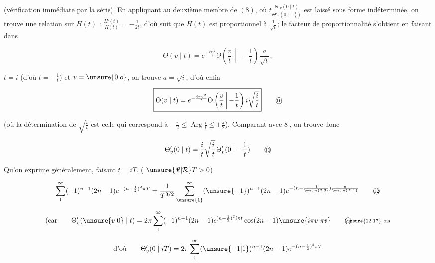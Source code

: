 (vérification immédiate par la série). En appliquant au deuxième membre de $(8)$, où $t\frac{{\Theta}'_v(0\mid t)}{\Theta'_v(0\mid-\frac1t)}$ est laissé sous forme indéterminée, on trouve une relation sur $H(t)$ : $\frac{H'(t)}{H(t)}=-\frac1{2t}$, d'où suit que $H(t)$ est proportionnel à $\frac1{\sqrt t}$; le facteur de proportionnalité s'obtient en faisant dans

\[
\Theta(v\mid t)=e^{-\frac{i\pi v^2}{t}}\Theta\left(\frac vt\,\middle|\,-\frac1t\right)\frac a{\sqrt t},
\]

$t=i$ (d'où $t=-\frac1t$) et $v=\unsure{0|o}$, on trouve $a=\sqrt i$, d'où enfin

\[
\boxed{\Theta(v\mid t)=e^{-\frac{i\pi v^2}{t}}\Theta\left(\frac vt\,\middle|\,-\frac1t\right)i\sqrt{\frac it}}
\tag*{\textcircled{\scriptsize 10}}
\]

(où la détermination de $\sqrt{\frac it}$ est celle qui correspond à $-\frac{\pi}{2}\leq\operatorname{Arg}\frac it\leq+\frac{\pi}{2}$). Comparant avec \textcircled{\scriptsize 8}, on trouve donc

\[
\Theta'_v(0\mid t)=\frac{i}t\sqrt{\frac it}\,\Theta'_v(0\mid-\frac1t)
\tag*{\textcircled{\scriptsize 11}}
\]

Qu'on exprime généralement, faisant $t=iT$. ( $\unsure{\Re|\mathcal R}T>0$)

\[
\sum_1^\infty(-1)^{n-1}(2n-1)e^{-(n-\frac12)^2\pi T}
=\frac1{T^{3/2}}\sum_{\unsure{1}}^\infty(\unsure{-1})^{n-1}(2n-1)e^{-(n-\frac1{\unsure{2|3}})\frac{\pi}{\unsure{T|1}}}
\tag*{\textcircled{\scriptsize 12}}
\]

\[
\text{(car}\qquad\Theta'_v(\unsure{v|0}\mid t)=2\pi\sum_1^\infty(-1)^{n-1}(2n-1)e^{(n-\frac12)^2i\pi t}\cos(2n-1)\unsure{i\pi v|\pi v}
\tag*{\textcircled{\scriptsize \unsure{12|17} bis}}
\]

\[
\text{d'où}\qquad\Theta'_v(0\mid iT)=2\pi\sum_1^\infty(\unsure{-1|1})^{n-1}(2n-1)e^{-(n-\frac12)^2\pi T}
\]

